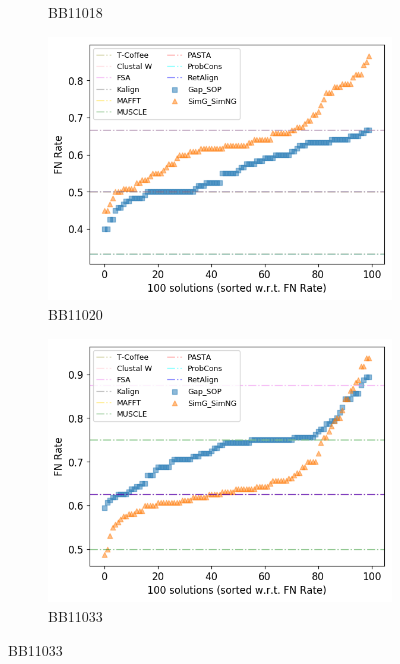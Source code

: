 \begin{figure}[!htbp]
\begin{adjustwidth}{-1cm}{-1cm}
\begin{subfigure}{0.22\textwidth}
		\caption{BB11018}
	\end{subfigure}
	\begin{subfigure}{0.22\textwidth}
		\includegraphics[width=\columnwidth]{Figure/summary/precomputedInit/Balibase/BB11020_fnrate_density_single_run}
		\caption{BB11020}
	\end{subfigure}
	\begin{subfigure}{0.22\textwidth}
		\includegraphics[width=\columnwidth]{Figure/summary/precomputedInit/Balibase/BB11033_fnrate_density_single_run}
		\caption{BB11033}
	\end{subfigure}

\end{adjustwidth}
\end{figure}
